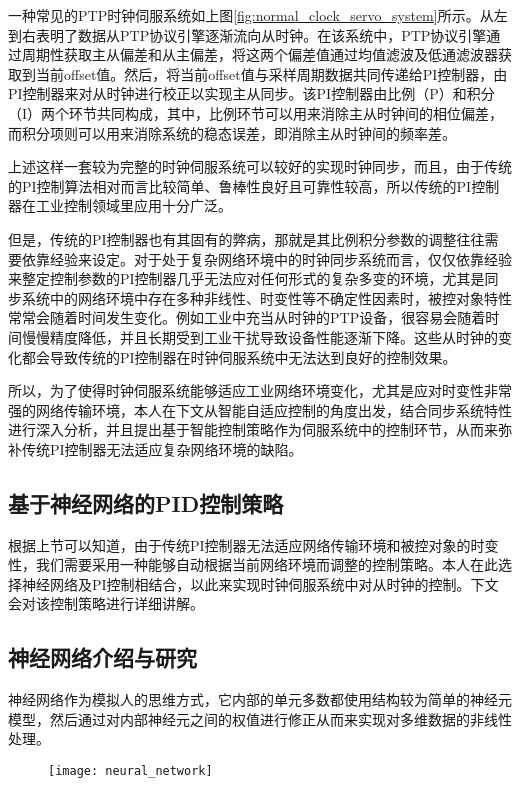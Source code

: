 一种常见的PTP时钟伺服系统如上图\ref{fig:normal_clock_servo_system}所示。从左到右表明了数据从PTP协议引擎逐渐流向从时钟。在该系统中，PTP协议引擎通过周期性获取主从偏差和从主偏差，将这两个偏差值通过均值滤波及低通滤波器获取到当前offset值。然后，将当前offset值与采样周期数据共同传递给PI控制器，由PI控制器来对从时钟进行校正以实现主从同步。该PI控制器由比例（P）和积分（I）两个环节共同构成，其中，比例环节可以用来消除主从时钟间的相位偏差，而积分项则可以用来消除系统的稳态误差，即消除主从时钟间的频率差\supercite{58}。

上述这样一套较为完整的时钟伺服系统可以较好的实现时钟同步，而且，由于传统的PI控制算法相对而言比较简单、鲁棒性良好且可靠性较高，所以传统的PI控制器在工业控制领域里应用十分广泛。

但是，传统的PI控制器也有其固有的弊病，那就是其比例积分参数的调整往往需要依靠经验来设定。对于处于复杂网络环境中的时钟同步系统而言，仅仅依靠经验来整定控制参数的PI控制器几乎无法应对任何形式的复杂多变的环境，尤其是同步系统中的网络环境中存在多种非线性、时变性等不确定性因素时，被控对象特性常常会随着时间发生变化。例如工业中充当从时钟的PTP设备，很容易会随着时间慢慢精度降低，并且长期受到工业干扰导致设备性能逐渐下降\supercite{59}。这些从时钟的变化都会导致传统的PI控制器在时钟伺服系统中无法达到良好的控制效果。

所以，为了使得时钟伺服系统能够适应工业网络环境变化，尤其是应对时变性非常强的网络传输环境，本人在下文从智能自适应控制的角度出发，结合同步系统特性进行深入分析，并且提出基于智能控制策略作为伺服系统中的控制环节，从而来弥补传统PI控制器无法适应复杂网络环境的缺陷。

\subsection{基于神经网络的PID控制策略}
根据上节可以知道，由于传统PI控制器无法适应网络传输环境和被控对象的时变性，我们需要采用一种能够自动根据当前网络环境而调整的控制策略。本人在此选择神经网络及PI控制相结合，以此来实现时钟伺服系统中对从时钟的控制。下文会对该控制策略进行详细讲解。

\subsection{神经网络介绍与研究}
神经网络作为模拟人的思维方式，它内部的单元多数都使用结构较为简单的神经元模型，然后通过对内部神经元之间的权值进行修正从而来实现对多维数据的非线性处理\supercite{61}。

\begin{figure}[!hbp]
  \centering
  \begin{minipage}[b]{0.6\textwidth}
    \captionstyle{\centering}
    \centering
    \texttt{[image: neural\_network]}
  \end{minipage}     
\end{figure}

